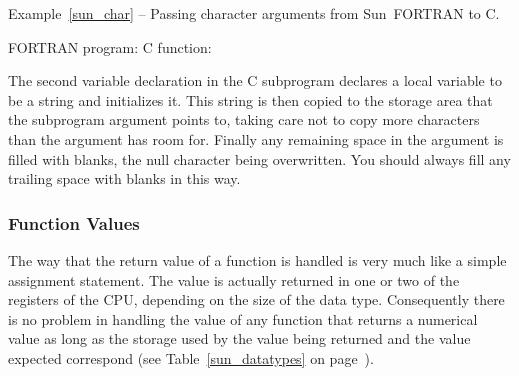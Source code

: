 \documentclass[twoside,11pt]{article}
\newcommand{\latex}[1]{#1}
\renewcommand{\_}{\texttt{\symbol{95}}}
\newcounter{examples}
\begin{document}
\label{sun_char}
\begin{center}
Example\latex{~\ref{sun_char}}
-- Passing character arguments from Sun~FORTRAN to C\@.
\end{center}
\nopagebreak[4]
FORTRAN program:
\pagebreak[1]
C function:

The second variable declaration in the C subprogram declares a local variable
to be a string and initializes it. This string is then copied to the storage
area that the subprogram argument points to, taking care not to copy more
characters than the argument has room for. Finally any remaining space in the
argument is filled with blanks, the null character being overwritten. You
should always fill any trailing space with blanks in this way. 

\subsubsection{Function Values}

The way that the return value of a function is handled is very much like a
simple assignment statement. The value is actually returned in one or two of
the registers of the CPU, depending on the size of the data type. Consequently
there is no problem in handling the value of any function that returns a
numerical value as long as the storage used by the value being returned and the
value expected correspond 
(see Table~\ref{sun_datatypes}\latex{ on page~\pageref{sun_datatypes}}). 
\end{document}
